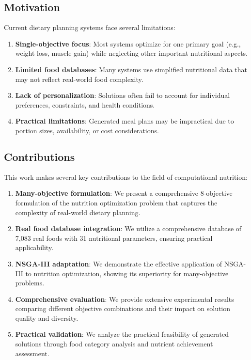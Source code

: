 \documentclass[12pt,a4paper]{article}
\begin{document}
\subsection{Motivation}

Current dietary planning systems face several limitations:

\begin{enumerate}
    \item \textbf{Single-objective focus}: Most systems optimize for one primary goal (e.g., weight loss, muscle gain) while neglecting other important nutritional aspects.
    \item \textbf{Limited food databases}: Many systems use simplified nutritional data that may not reflect real-world food complexity.
    \item \textbf{Lack of personalization}: Solutions often fail to account for individual preferences, constraints, and health conditions.
    \item \textbf{Practical limitations}: Generated meal plans may be impractical due to portion sizes, availability, or cost considerations.
\end{enumerate}

\subsection{Contributions}

This work makes several key contributions to the field of computational nutrition:

\begin{enumerate}
    \item \textbf{Many-objective formulation}: We present a comprehensive 8-objective formulation of the nutrition optimization problem that captures the complexity of real-world dietary planning.
    \item \textbf{Real food database integration}: We utilize a comprehensive database of 7,083 real foods with 31 nutritional parameters, ensuring practical applicability.
    \item \textbf{NSGA-III adaptation}: We demonstrate the effective application of NSGA-III to nutrition optimization, showing its superiority for many-objective problems.
    \item \textbf{Comprehensive evaluation}: We provide extensive experimental results comparing different objective combinations and their impact on solution quality and diversity.
    \item \textbf{Practical validation}: We analyze the practical feasibility of generated solutions through food category analysis and nutrient achievement assessment.
\end{enumerate}
\end{document}
